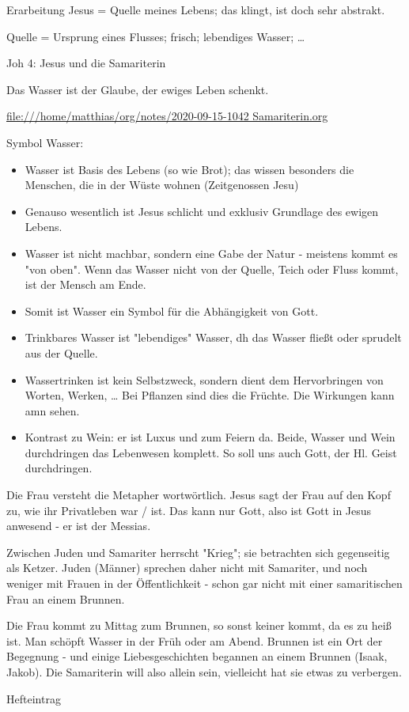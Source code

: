 \documentclass[pdftex,a4paper,12pt,bibliography=totoc,draft]{scrartcl}
\begin{document}
\begin{frame}[label={sec:orgd07d863}]{Erarbeitung}
Jesus = Quelle meines Lebens; das klingt, ist doch sehr abstrakt.

Quelle = Ursprung eines Flusses; frisch; lebendiges Wasser; \ldots{}

Joh 4: Jesus und die Samariterin

Das Wasser ist der Glaube, der ewiges Leben schenkt.

\url{file:///home/matthias/org/notes/2020-09-15-1042 Samariterin.org}

Symbol Wasser:
\begin{itemize}
\item Wasser ist Basis des Lebens (so wie Brot); das wissen besonders die Menschen, die in der Wüste wohnen (Zeitgenossen Jesu)
\item Genauso wesentlich ist Jesus schlicht und exklusiv Grundlage des ewigen Lebens.
\item Wasser ist nicht machbar, sondern eine Gabe der Natur - meistens kommt es "von oben". Wenn das Wasser nicht von der Quelle, Teich oder Fluss kommt, ist der Mensch am Ende.
\item Somit ist Wasser ein Symbol für die Abhängigkeit von Gott.
\item Trinkbares Wasser ist "lebendiges" Wasser, dh das Wasser fließt oder sprudelt aus der Quelle.
\item Wassertrinken ist kein Selbstzweck, sondern dient dem Hervorbringen von Worten, Werken, \ldots{} Bei Pflanzen sind dies die Früchte. Die Wirkungen kann amn sehen.
\item Kontrast zu Wein: er ist Luxus und zum Feiern da. Beide, Wasser und Wein durchdringen das Lebenwesen komplett. So soll uns auch Gott, der Hl. Geist durchdringen.
\end{itemize}

Die Frau versteht die Metapher wortwörtlich. Jesus sagt der Frau auf den Kopf zu, wie ihr Privatleben war / ist. Das kann nur Gott, also ist Gott in Jesus anwesend - er ist der Messias. 

Zwischen Juden und Samariter herrscht "Krieg"; sie betrachten sich gegenseitig als Ketzer. Juden (Männer) sprechen daher nicht mit Samariter, und noch weniger mit Frauen in der Öffentlichkeit - schon gar nicht mit einer samaritischen Frau an einem Brunnen. 

Die Frau kommt zu Mittag zum Brunnen, so sonst keiner kommt, da es zu heiß ist. Man schöpft Wasser in der Früh oder am Abend. Brunnen ist ein Ort der Begegnung - und einige Liebesgeschichten begannen an einem Brunnen (Isaak, Jakob). Die Samariterin will also allein sein, vielleicht hat sie etwas zu verbergen. 
\end{frame}

\begin{frame}[label={sec:org58f3735}]{Hefteintrag}
\end{frame}
\end{document}
